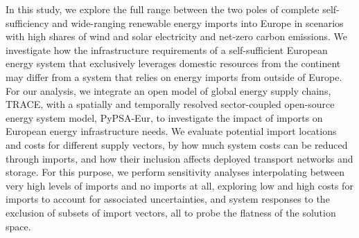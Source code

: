 In this study, we explore the full range between the two poles of complete
self-sufficiency and wide-ranging renewable energy imports into Europe in
scenarios with high shares of wind and solar electricity and net-zero carbon
emissions. We investigate how the infrastructure requirements of a
self-sufficient European energy system that exclusively leverages domestic
resources from the continent may differ from a system that relies on energy
imports from outside of Europe. For our analysis, we integrate an open model of
global energy supply chains, TRACE,\cite{hamppImportOptions2023} with a
spatially and temporally resolved sector-coupled open-source energy system
model, PyPSA-Eur,\cite{PyPSAEurSecSectorCoupled} to investigate the impact of
imports on European energy infrastructure needs. We evaluate potential import
locations and costs for different supply vectors, by how much system costs can
be reduced through imports, and how their inclusion affects deployed transport
networks and storage. For this purpose, we perform sensitivity analyses
interpolating between very high levels of imports and no imports at all,
exploring low and high costs for imports to account for associated
uncertainties, and system responses to the exclusion of subsets of import
vectors, all to probe the flatness of the solution space.


